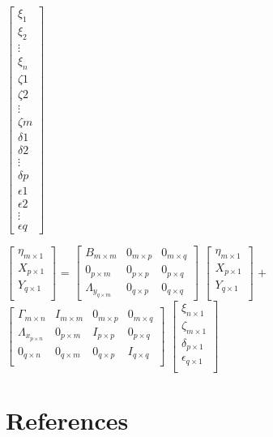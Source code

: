 \documentclass[man]{apa6}
\theoremstyle{definition}
\theoremstyle{definition}
\theoremstyle{definition}
\theoremstyle{remark}
\begin{document}
\(\begin{bmatrix}  \xi_{1} \\  \xi_{2} \\  \vdots \\  \xi_{n} \\  \zeta{1} \\  \zeta{2} \\  \vdots \\  \zeta{m} \\  \delta{1} \\  \delta{2} \\  \vdots \\  \delta{p} \\  \epsilon{1} \\  \epsilon{2} \\  \vdots \\  \epsilon{q} \end{bmatrix}\)

\(\begin{bmatrix}  \eta_{m \times 1} \\  X_{p \times 1} \\  Y_{q \times 1} \\ \end{bmatrix}\)
=
\(\left[ \begin{array}{c|c|c} B_{m \times m} & 0_{m \times p} & 0_{m \times q}\\ \hline 0_{p \times m} & 0_{p \times p} & 0_{p \times q}\\ \hline \Lambda_{y_{q \times m}} & 0_{q \times p} & 0_{q \times q} \end{array} \right]\)
\(\begin{bmatrix}  \eta_{m \times 1} \\  X_{p \times 1} \\  Y_{q \times 1} \\ \end{bmatrix}\)
\(+\)
\(\left[ \begin{array}{c|c|c|c} \Gamma_{m \times n} & I_{m \times m} & 0_{m \times p} & 0_{m \times q}\\ \hline \Lambda_{x_{p \times n}} & 0_{p \times m} & I_{p \times p} & 0_{p \times q}\\ \hline 0_{q \times n} & 0_{q \times m} & 0_{q \times p} & I_{q \times q}\\ \end{array} \right]\)
\(\begin{bmatrix}  \xi_{n \times 1} \\  \zeta_{m \times 1} \\  \delta_{p \times 1} \\  \epsilon_{q \times 1} \\ \end{bmatrix}\)

\newpage

\hypertarget{references}{%
\section{References}\label{references}}

\setlength{\parindent}{-0.5in}
\setlength{\leftskip}{0.5in}
\end{document}
